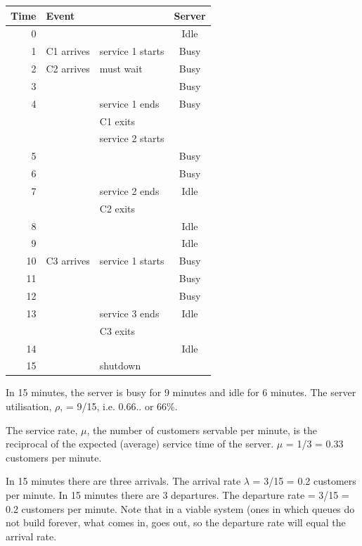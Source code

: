 \documentclass[12pt,fleqn]{report}
\begin{document}
{\small 
\begin{center}
\begin{tabular}{|| r | l | l | c|| }
\hline
Time & Event      &                  & Server \\
\hline
0    &            &                  & Idle   \\
1    & C1 arrives & service 1 starts & Busy \\ 
2    & C2 arrives & must wait        & Busy \\
3    &            &                  & Busy \\
4    &            & service 1 ends   & Busy  \\
     &            & C1 exits         & \\
     &            & service 2 starts & \\
5    &            &                  & Busy \\
6    &            &                  & Busy \\
7    &            & service 2 ends   & Idle  \\
     &            & C2 exits         & \\
8    &            &                  & Idle \\
9    &            &                  & Idle \\
10   & C3 arrives & service 1 starts & Busy \\ 
11   &            &                  & Busy \\
12    &            &                  & Busy \\
13    &            & service 3 ends   & Idle  \\
      &            & C3 exits         & \\
14    &            &                  & Idle \\
15    &            & shutdown         &      \\
\hline
\end{tabular}
\end{center}}



In 15 minutes, the server is busy for 9 minutes and idle for 
6 minutes.
The server utilisation, $\rho$, = 9/15, i.e. 0.66.. or 66\%.

The service rate, $\mu$, the number of customers servable per minute,
is the reciprocal of the expected (average) service time of the
server. $\mu$ = 1/3 = 0.33 customers per minute.

In 15 minutes there are three arrivals. The arrival rate $\lambda$ =
3/15 = 0.2 customers per minute.
In 15 minutes there are 3 departures. 
The departure rate = 3/15 = 0.2 customers per minute.
Note that in a viable system (ones in which queues do
not build forever, what comes in, goes out, so the
departure rate will equal the arrival rate.
\end{document}
